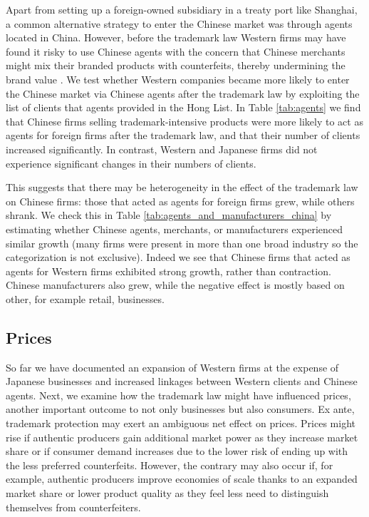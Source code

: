 \documentclass[12pt]{article}
\begin{document}
Apart from setting up a foreign-owned subsidiary in a treaty port like Shanghai, a common alternative strategy to enter the Chinese market  was through agents located in China. However, before the trademark law Western firms may have found it risky to use Chinese agents with the concern that Chinese merchants might mix their branded products with counterfeits, thereby undermining the brand value \citep{Motono2011}. We test whether Western companies became more likely to enter the Chinese market via Chinese agents after the trademark law by exploiting the list of clients that agents provided in the Hong List. In Table \ref{tab:agents} we find that Chinese firms selling trademark-intensive products were more likely to act as agents for foreign firms after the trademark law, and that their number of clients increased significantly. In contrast, Western and Japanese firms did not experience significant changes in their numbers of clients.  

This suggests that there may be heterogeneity in the effect of the trademark law on Chinese firms: those that acted as agents for foreign firms grew, while others shrank. We check this in Table \ref{tab:agents_and_manufacturers_china} by estimating whether Chinese agents, merchants, or manufacturers experienced similar growth (many firms were present in more than one broad industry so the categorization is not exclusive). Indeed we see that Chinese firms that acted as agents for Western firms exhibited strong growth, rather than contraction. Chinese manufacturers also grew, while the negative effect is mostly based on other, for example retail, businesses. 



\subsection{Prices} \label{subsec:results_prices}

So far we have documented an expansion of Western firms at the expense of Japanese businesses and increased linkages between Western clients and Chinese agents. Next, we examine how the trademark law might have influenced prices, another important outcome to not only businesses but also consumers. Ex ante, trademark protection may exert an ambiguous net effect on prices. Prices might rise if authentic producers gain additional market power as they increase market share or if consumer demand increases due to the lower risk of ending up with the less preferred counterfeits. However, the contrary may also occur if, for example, authentic producers improve economies of scale thanks to an expanded market share or lower product quality as they feel less need to distinguish themselves from counterfeiters.
\end{document}
